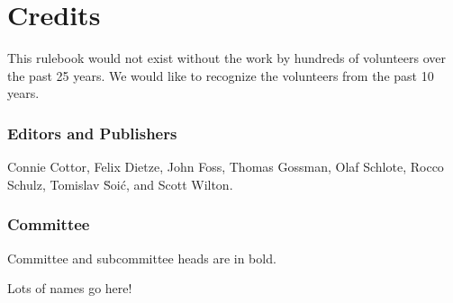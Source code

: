 \part{Credits}

This rulebook would not exist without the work by hundreds of volunteers over the past 25 years.
We would like to recognize the volunteers from the past 10 years.

\section{Editors and Publishers}
Connie Cottor,
Felix Dietze,
John Foss,
Thomas Gossman,
Olaf Schlote,
Rocco Schulz,
Tomislav \u{S}oi\'{c},
and Scott Wilton.

\section{Committee}

Committee and subcommittee heads are in bold.

Lots of names go here!
